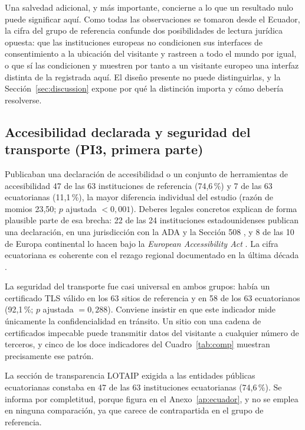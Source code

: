 \documentclass[pdflatex,sn-basic,Numbered]{sn-jnl}
\theoremstyle{thmstyleone}
\theoremstyle{thmstyletwo}
\theoremstyle{thmstylethree}
\begin{document}
Una salvedad adicional, y m\'as importante, concierne a lo que un resultado nulo puede significar aqu\'i. Como todas las observaciones se tomaron desde el Ecuador, la cifra del grupo de referencia confunde dos posibilidades de lectura jur\'idica opuesta: que las instituciones europeas no condicionen sus interfaces de consentimiento a la ubicaci\'on del visitante y rastreen a todo el mundo por igual, o que s\'i las condicionen y muestren por tanto a un visitante europeo una interfaz distinta de la registrada aqu\'i. El dise\~no presente no puede distinguirlas, y la Secci\'on~\ref{sec:discussion} expone por qu\'e la distinci\'on importa y c\'omo deber\'ia resolverse.

\subsection{Accesibilidad declarada y seguridad del transporte (PI3, primera parte)}\label{sec:results-declared}

Publicaban una declaraci\'on de accesibilidad o un conjunto de herramientas de accesibilidad 47 de las 63 instituciones de referencia (74,6\,\%) y 7 de las 63 ecuatorianas (11,1\,\%), la mayor diferencia individual del estudio (raz\'on de momios 23,50; $p$ ajustada $<0{,}001$). Deberes legales concretos explican de forma plausible parte de esa brecha: 22 de las 24 instituciones estadounidenses publican una declaraci\'on, en una jurisdicci\'on con la ADA y la Secci\'on 508 \citep{ada1990,section508}, y 8 de las 10 de Europa continental lo hacen bajo la \emph{European Accessibility Act} \citep{eaa2019}. La cifra ecuatoriana es coherente con el rezago regional documentado en la \'ultima d\'ecada \citep{campoverdemolina2023accessibility,acostavargas2020dataset}.

La seguridad del transporte fue casi universal en ambos grupos: hab\'ia un certificado TLS v\'alido en los 63 sitios de referencia y en 58 de los 63 ecuatorianos (92,1\,\%; $p$ ajustada $=0{,}288$). Conviene insistir en que este indicador mide \'unicamente la confidencialidad en tr\'ansito. Un sitio con una cadena de certificados impecable puede transmitir datos del visitante a cualquier n\'umero de terceros, y cinco de los doce indicadores del Cuadro~\ref{tab:comp} muestran precisamente ese patr\'on.

La secci\'on de transparencia LOTAIP exigida a las entidades p\'ublicas ecuatorianas constaba en 47 de las 63 instituciones ecuatorianas (74,6\,\%). Se informa por completitud, porque figura en el Anexo~\ref{ap:ecuador}, y no se emplea en ninguna comparaci\'on, ya que carece de contrapartida en el grupo de referencia.
\end{document}
